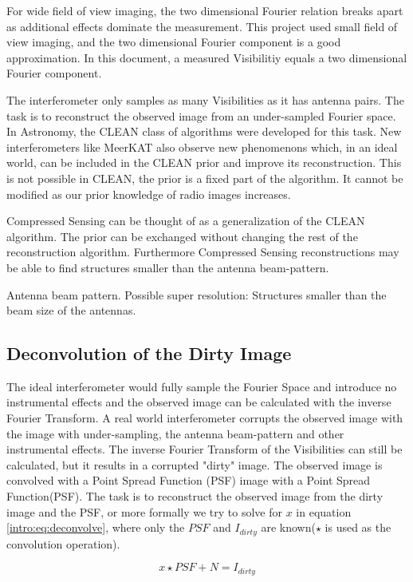 For wide field of view imaging, the two dimensional Fourier relation breaks apart as additional effects dominate the measurement. This project used small field of view imaging, and the two dimensional Fourier component is a good approximation. In this document, a measured Visibilitiy equals a two dimensional Fourier component.

The interferometer only samples as many Visibilities as it has antenna pairs. The task is to reconstruct the observed image from an under-sampled Fourier space. In Astronomy, the CLEAN class of algorithms\cite{hogbom1974aperture}\cite{schwab1984relaxing}\cite{rich2008multi}\cite{rau2011multi} were developed for this task. New interferometers like MeerKAT also observe new phenomenons which, in an ideal world, can be included in the CLEAN prior and improve its reconstruction. This is not possible in CLEAN, the prior is a fixed part of the algorithm. It cannot be modified as our prior knowledge of radio images increases.

Compressed Sensing can be thought of as a generalization of the CLEAN algorithm. The prior can be exchanged without changing the rest of the reconstruction algorithm. Furthermore Compressed Sensing reconstructions may be able to find structures smaller than the antenna beam-pattern\cite{girard2015sparse}.

Antenna beam pattern. Possible super resolution: Structures smaller than the beam size of the antennas.


\subsection{Deconvolution of the Dirty Image}
The ideal interferometer would fully sample the Fourier Space and introduce no instrumental effects and the observed image can be calculated with the inverse Fourier Transform. A real world interferometer corrupts the observed image with the image with under-sampling, the antenna beam-pattern and other instrumental effects. The inverse Fourier Transform of the Visibilities can still be calculated, but it results in a corrupted "dirty" image. The observed image is convolved with a Point Spread Function (PSF) image with a Point Spread Function(PSF). The task is to reconstruct the observed image from the dirty image and the PSF, or more formally we try to solve for $x$ in equation \eqref{intro:eq:deconvolve}, where only the $PSF$ and $I_{dirty}$ are known($\star$ is used as the convolution operation).

\begin{equation}\label{intro:eq:deconvolve}
x \star  PSF + N = I_{dirty} 
\end{equation}

